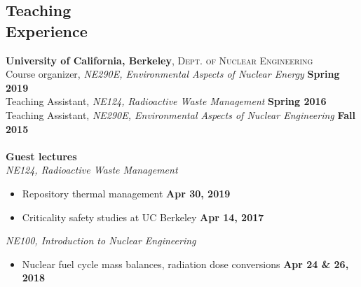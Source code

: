 \documentclass[margin,line]{resume}
\begin{document}
\begin{resume}
\section{\mysidestyle Teaching\\Experience}

\textbf{University of California, Berkeley}, \textsc{Dept. of Nuclear Engineering}\\
Course organizer, \textsl{NE290E, Environmental Aspects of Nuclear Energy}
    \hfill \textbf{Spring 2019} \\
Teaching Assistant, \textsl{NE124, Radioactive Waste Management} 
    \hfill \textbf{Spring 2016} \\
Teaching Assistant, \textsl{NE290E, Environmental Aspects of Nuclear Engineering} \hfill \textbf{Fall 2015}\\
\vspace{0mm}\\
\textbf{Guest lectures} \\
\textsl{NE124, Radioactive Waste Management}
    \begin{itemize} %
        \item Repository thermal management \hfill \textbf{Apr 30, 2019}\vspace{-1mm}
        \item Criticality safety studies at UC Berkeley \hfill \textbf{Apr 14, 2017}
    \end{itemize} \vspace{-4mm}
\textsl{NE100, Introduction to Nuclear Engineering}
    \begin{itemize}
        \item Nuclear fuel cycle mass balances, radiation dose conversions \hfill \textbf{Apr 24 \& 26, 2018} \\
    \end{itemize}
% 


\end{resume}
\end{document}
